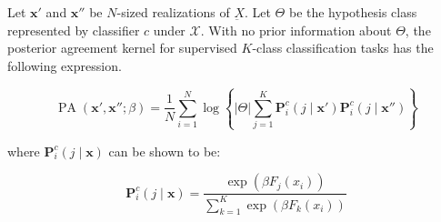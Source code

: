 \begin{theorem}
    Let $\bm{x}'$ and $\bm{x}''$ be $N$-sized realizations of $\underbar{X}$.
    Let $\Theta$ be the hypothesis class represented by classifier $c$ under $\mathcal{X}$.
    With no prior information about $\Theta$, the posterior agreement kernel
    for supervised $K$-class classification tasks has the following expression.

    $$
    \operatorname{PA}\left(\bm{x}', \bm{x}'' ; \beta\right)=\frac{1}{N} \sum_{i=1}^N \log \left\{|\Theta| \sum_{j =1}^K \mathbf{P}_i^c\left(j \mid \bm{x}' \right) \mathbf{P}_i^c \left( j \mid \bm{x}'' \right)\right\}
    $$

    where $\mathbf{P}_i^c(j \mid \bm{x})$ can be shown to be:

    $$
    \mathbf{P}_i^c\left(j \mid \bm{x}\right)=\frac{\exp\left(\beta F_{j}(x_i)\right)}{\sum_{k=1}^K\exp\left(\beta F_k(x_i)\right)}
    $$
\end{theorem}

